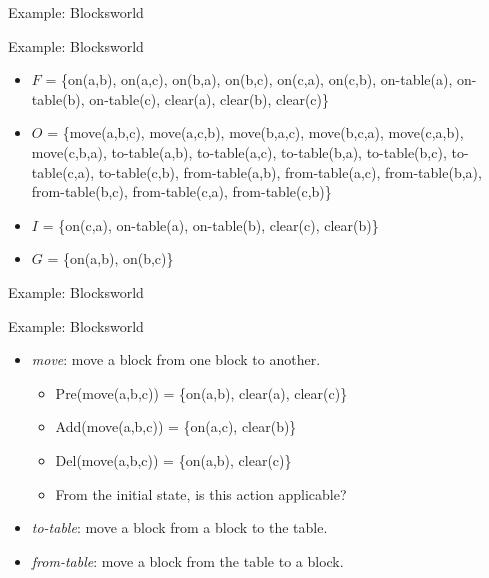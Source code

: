 \documentclass{beamer}
\begin{document}
\begin{frame}{Example: Blocksworld} 
    \begin{exampleblock}{\strut Example: Blocksworld}
      \begin{itemize}
      \item $F$ = \{on(a,b), on(a,c), on(b,a), on(b,c), on(c,a), on(c,b), on-table(a), on-table(b), on-table(c), clear(a), clear(b), clear(c)\}

       \item $O$ = \{move(a,b,c), move(a,c,b), move(b,a,c), move(b,c,a), move(c,a,b), move(c,b,a), to-table(a,b), to-table(a,c), to-table(b,a), to-table(b,c), to-table(c,a), to-table(c,b), from-table(a,b), from-table(a,c), from-table(b,a), from-table(b,c), from-table(c,a), from-table(c,b)\}

        \item $I$ = \{on(c,a), on-table(a), on-table(b), clear(c), clear(b)\}

         \item $G$ = \{on(a,b), on(b,c)\}
      \end{itemize}
    \end{exampleblock}
\end{frame}

\begin{frame}{Example: Blocksworld}
    \begin{exampleblock}{\strut Example: Blocksworld}
      \begin{itemize}
      \item \emph{move}: move a block from one block to another.
      \begin{itemize}
        \item Pre(move(a,b,c)) = \{on(a,b), clear(a), clear(c)\}
        \item Add(move(a,b,c)) = \{on(a,c), clear(b)\}
        \item Del(move(a,b,c)) = \{on(a,b), clear(c)\}
        \item From the initial state, is this action applicable? %
      \end{itemize}
      \item \emph{to-table}: move a block from a block to the table.
      \item \emph{from-table}: move a block from the table to a block.
      \end{itemize}
    \end{exampleblock}
\end{frame}
\end{document}
